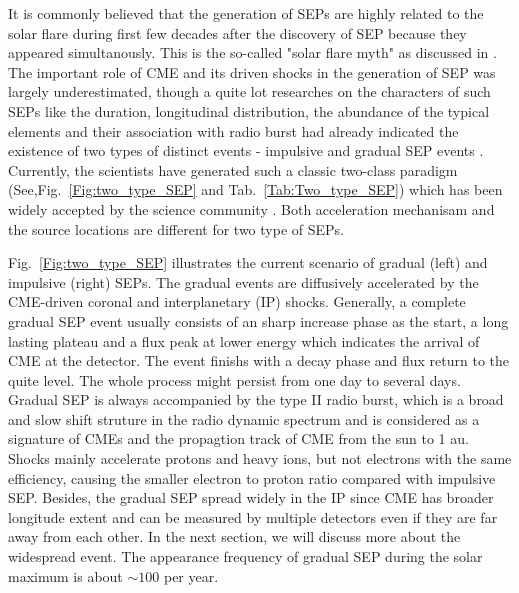 It is commonly believed that the generation of \acp{SEP} are highly related to the solar flare during first few decades after the discovery of \ac{SEP} because they appeared simultanously. This is the so-called "solar flare myth" as discussed in \citep{gosling1993the}.  The important role of \ac{CME} and its driven shocks in the generation of \ac{SEP} was largely underestimated, though a quite lot researches on the characters of such \acp{SEP} like the duration, longitudinal distribution, the abundance of the typical elements and their association with radio burst had already indicated the existence of two types of distinct events - impulsive and gradual \ac{SEP} events \citep{kahler1978prompt,kahler1984associations,cliver1982injection,cane1986two, reames1988ApJ}.
Currently, the scientists have generated such a classic two-class paradigm (See,Fig.~\ref{Fig:two_type_SEP} and Tab.~\ref{Tab:Two_type_SEP}) which has been widely accepted by the science community \citep{kallenrode2003current, reames2013two,Desai_Diacalone2016LRSP, Reames2021LNP}. Both acceleration mechanisam and the source locations are different for two type of \acp{SEP}.


Fig.~\ref{Fig:two_type_SEP} illustrates the current scenario of gradual (left) and impulsive (right) \acp{SEP}.
The gradual events are diffusively accelerated by the CME-driven coronal and interplanetary (IP) shocks. Generally, a complete gradual \ac{SEP} event usually consists of an sharp increase phase as the start, a long lasting plateau and a flux peak at lower energy which indicates the arrival of \ac{CME} at the detector. The event finishs with a decay phase and flux return to the quite level. The whole process might persist from one day to several days. Gradual \ac{SEP} is always accompanied by the type II radio burst, which is a broad and slow shift struture in the radio dynamic spectrum and is considered as a signature of \acp{CME} and the propagtion track of \ac{CME} from the sun to 1 au. Shocks mainly accelerate protons and heavy ions, but not electrons with the same efficiency, causing the smaller electron to proton ratio compared with impulsive \ac{SEP}. Besides, the gradual \ac{SEP} spread widely in the IP since \ac{CME} has broader longitude extent and can be measured by multiple detectors even if they are far away from each other. In the next section, we will discuss more about the widespread event. The appearance frequency of gradual \ac{SEP} during the solar maximum is about $\sim 100$ per year.

